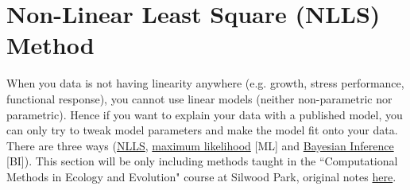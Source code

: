 \documentclass[../note.tex]{subfiles} %
\begin{document}
\section{Non-Linear Least Square (NLLS) Method}
When you data is not having linearity anywhere (e.g. growth, stress performance, functional response), you cannot use linear models (neither non-parametric nor parametric).  Hence if you want to explain your data with a published model, you can only try to tweak model parameters and make the model fit onto your data.  There are three ways (\href{https://datascienceplus.com/first-steps-with-non-linear-regression-in-r/}{NLLS}, \href{https://www.r-bloggers.com/fitting-a-model-by-maximum-likelihood/}{maximum likelihood} [ML] and \href{https://www.r-bloggers.com/bayesian-models-in-r-2/}{Bayesian Inference} [BI]).  This section will be only including methods taught in the ``Computational Methods in Ecology and Evolution" course at Silwood Park, original notes \href{https://nbviewer.jupyter.org/github/mhasoba/TheMulQuaBio/blob/master/notebooks/Appendix-ModelFitting.ipynb}{here}.
\end{document}
